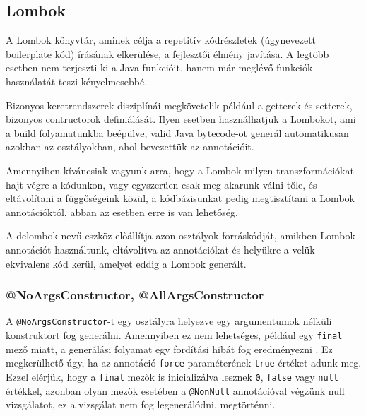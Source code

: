 \subsection{Lombok}

A Lombok könyvtár, aminek célja a repetitív kódrészletek (úgynevezett boilerplate kód) írásának elkerülése, a fejlesztői élmény javítása. A legtöbb esetben nem terjeszti ki a Java funkcióit, hanem már meglévő funkciók használatát teszi kényelmesebbé. \par

Bizonyos keretrendszerek disziplínái megkövetelik például a getterek és setterek, bizonyos contructorok definiálását. Ilyen esetben használhatjuk a Lombokot, ami a build folyamatunkba beépülve, valid Java bytecode-ot generál automatikusan azokban az osztályokban, ahol bevezettük az annotációit.\par

Amennyiben kíváncsiak vagyunk arra, hogy a Lombok milyen transzformációkat hajt végre a kódunkon, vagy egyszerűen csak meg akarunk válni tőle, és eltávolítani a függőségeink közül, a kódbázisunkat pedig megtisztítani a Lombok annotációktól, abban az esetben erre is van lehetőség. \par

A delombok nevű eszköz előállítja azon osztályok forráskódját, amikben Lombok annotációt használtunk, eltávolítva az annotációkat és helyükre a velük ekvivalens kód kerül, amelyet eddig a Lombok generált. \par


\subsubsection{@NoArgsConstructor, @AllArgsConstructor}

A \lstinline|@NoArgsConstructor|-t egy osztályra helyezve egy argumentumok nélküli konstruktort fog generálni. Amennyiben ez nem lehetséges, például egy \lstinline|final| mező miatt, a generálási folyamat egy fordítási hibát fog eredményezni \cite{lombokConstructorDocumentation}. Ez megkerülhető úgy, ha az annotáció \lstinline|force| paraméterének \lstinline|true| értéket adunk meg. Ezzel elérjük, hogy a \lstinline|final| mezők is inicializálva lesznek \lstinline|0|, \lstinline|false| vagy \lstinline|null| értékkel, azonban olyan mezők esetében a \lstinline|@NonNull| annotációval végzünk null vizsgálatot, ez a vizsgálat nem fog legenerálódni, megtörténni. \par

